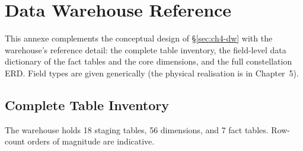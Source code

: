 \chapter{Data Warehouse Reference}
\label{anx:dw}

This annexe complements the conceptual design of \S\ref{sec:ch4-dw} with the warehouse's reference
detail: the complete table inventory, the field-level data dictionary of the fact tables and the core
dimensions, and the full constellation ERD. Field types are given generically (the physical
realisation is in Chapter~5).

\section{Complete Table Inventory}
\label{anx:dw-inventory}

The warehouse holds 18 staging tables, 56 dimensions, and 7 fact tables.
Row-count orders of magnitude are indicative.


